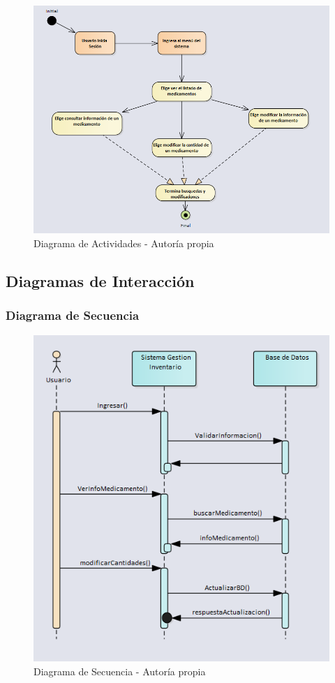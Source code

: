 \begin{center}
    \begin{figure}[htb]
        \centering
        \includegraphics[width=1.0\linewidth] {capitulo5/img/Actividades.png}
        \caption{Diagrama de Actividades - Autor\'ia propia}
    \end{figure}
\end{center}
\newpage

\subsection{ Diagramas de Interacción}
\subsubsection{ Diagrama de Secuencia}

\begin{center}
    \begin{figure}[htb]
        \centering
        \includegraphics[width = 0.8\linewidth] {libro/capitulo5/img/Secuencia.PNG}
        \caption{Diagrama de Secuencia - Autor\'ia propia}
        \label{fig:my_label}
    \end{figure}
\end{center}

